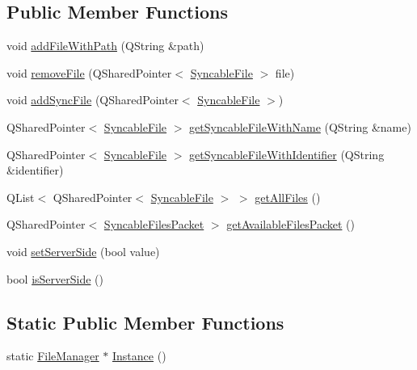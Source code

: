 \subsection*{Public Member Functions}
\begin{DoxyCompactItemize}
\item 
void \hyperlink{class_file_manager_a60c5ccbe09b28ec490bc8f21e0e66c4d}{addFileWithPath} (QString \&path)
\item 
void \hyperlink{class_file_manager_a5cb8a2cdfb49753efeb7dbf2fcdfb4a5}{removeFile} (QSharedPointer$<$ \hyperlink{class_syncable_file}{SyncableFile} $>$ file)
\item 
void \hyperlink{class_file_manager_ad222e2b0ca8c0d0e6dd5716624cf8f06}{addSyncFile} (QSharedPointer$<$ \hyperlink{class_syncable_file}{SyncableFile} $>$)
\item 
QSharedPointer$<$ \hyperlink{class_syncable_file}{SyncableFile} $>$ \hyperlink{class_file_manager_a2961bda971d6458ab55832b41704d9f9}{getSyncableFileWithName} (QString \&name)
\item 
QSharedPointer$<$ \hyperlink{class_syncable_file}{SyncableFile} $>$ \hyperlink{class_file_manager_ad71a0047e9faa3f3510b9175ea47f2c4}{getSyncableFileWithIdentifier} (QString \&identifier)
\item 
QList$<$ QSharedPointer$<$ \hyperlink{class_syncable_file}{SyncableFile} $>$ $>$ \hyperlink{class_file_manager_a78d65093730b93c0c30f676e44021853}{getAllFiles} ()
\item 
QSharedPointer$<$ \hyperlink{class_syncable_files_packet}{SyncableFilesPacket} $>$ \hyperlink{class_file_manager_ab42fde7f37edfb81aa5262cea92ae5af}{getAvailableFilesPacket} ()
\item 
void \hyperlink{class_file_manager_a9f7a8b670ab37bc42aebb6d9a712541c}{setServerSide} (bool value)
\item 
bool \hyperlink{class_file_manager_a43fb32e069f3fc332ee6b956610f5c45}{isServerSide} ()
\end{DoxyCompactItemize}
\subsection*{Static Public Member Functions}
\begin{DoxyCompactItemize}
\item 
static \hyperlink{class_file_manager}{FileManager} $\ast$ \hyperlink{class_file_manager_a53d5d8ca38b516507565f0529c10c29c}{Instance} ()
\end{DoxyCompactItemize}


